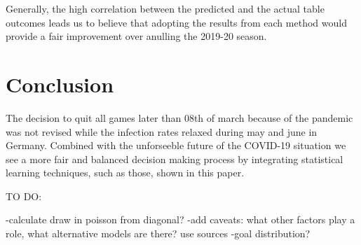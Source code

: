 \documentclass[12pt,a4paper]{article}
\begin{document}
Generally, the high correlation between the predicted and the actual
table outcomes leads us to believe that adopting the results from each
method would provide a fair improvement over anulling the 2019-20
season.





\hypertarget{conclusion}{%
\section{Conclusion}\label{conclusion}}

The decision to quit all games later than 08th of march because of the
pandemic was not revised while the infection rates relaxed during may
and june in Germany. Combined with the unforseeble future of the
COVID-19 situation we see a more fair and balanced decision making
process by integrating statistical learning techniques, such as those,
shown in this paper.

TO DO:

-calculate draw in poisson from diagonal? -add caveats: what other
factors play a role, what alternative models are there? use sources
-goal distribution?

\newpage

\printbibliography
\end{document}
